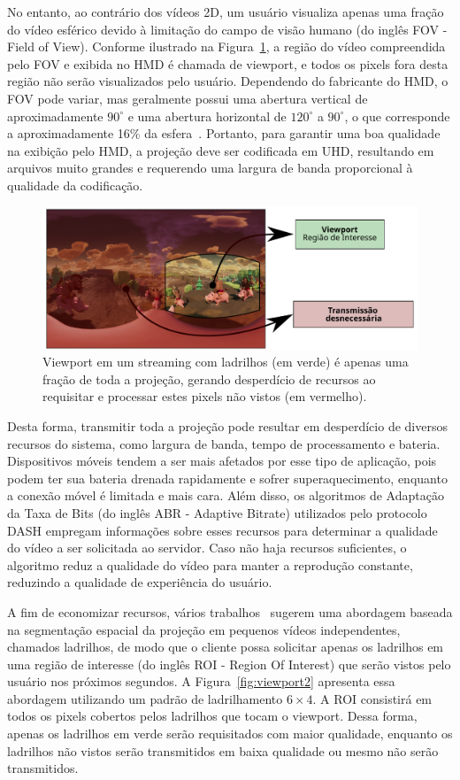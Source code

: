 No entanto, ao contrário dos vídeos 2D, um usuário visualiza apenas uma fração do vídeo esférico devido à limitação do campo de visão humano (do inglês FOV - Field of View). Conforme ilustrado na Figura~\ref{fig:viewport1}, a região do vídeo compreendida pelo FOV e exibida no HMD é chamada de viewport, e todos os pixels fora desta região não serão visualizados pelo usuário. Dependendo do fabricante do HMD, o FOV pode variar, mas geralmente possui uma abertura vertical de aproximadamente $90^{\circ}$ e uma abertura horizontal de $120^{\circ}$ a $90^{\circ}$, o que corresponde a aproximadamente 16\% da esfera~\cite{Afzal2017}. Portanto, para garantir uma boa qualidade na exibição pelo HMD, a projeção deve ser codificada em UHD, resultando em arquivos muito grandes e requerendo uma largura de banda proporcional à qualidade da codificação.

\begin{figure}[h]
	\centering
	\includegraphics[width=0.80\columnwidth]{fig/viewport1.pdf}
	\caption{Viewport em um streaming com ladrilhos (em verde) é apenas uma fração de toda a projeção, gerando desperdício de recursos ao requisitar e processar estes pixels não vistos (em vermelho).}
	\label{fig:viewport1}
\end{figure}

Desta forma, transmitir toda a projeção pode resultar em desperdício de diversos recursos do sistema, como largura de banda, tempo de processamento e bateria. Dispositivos móveis tendem a ser mais afetados por esse tipo de aplicação, pois podem ter sua bateria drenada rapidamente e sofrer superaquecimento, enquanto a conexão móvel é limitada e mais cara. Além disso, os algoritmos de Adaptação da Taxa de Bits (do inglês ABR - Adaptive Bitrate) utilizados pelo protocolo DASH empregam informações sobre esses recursos para determinar a qualidade do vídeo a ser solicitada ao servidor. Caso não haja recursos suficientes, o algoritmo reduz a qualidade do vídeo para manter a reprodução constante, reduzindo a qualidade de experiência do usuário.

A fim de economizar recursos, vários trabalhos~\cite{Alface2012, Zare2016, Qian2018, Liu2017, Graf2017, Xiao2018, Nasrabadi2019} sugerem uma abordagem baseada na segmentação espacial da projeção em pequenos vídeos independentes, chamados ladrilhos, de modo que o cliente possa solicitar apenas os ladrilhos em uma região de interesse (do inglês ROI - Region Of Interest) que serão vistos pelo usuário nos próximos segundos. A Figura~\ref{fig:viewport2} apresenta essa abordagem utilizando um padrão de ladrilhamento $6 \times 4$. A ROI consistirá em todos os pixels cobertos pelos ladrilhos que tocam o viewport. Dessa forma, apenas os ladrilhos em verde serão requisitados com maior qualidade, enquanto os ladrilhos não vistos serão transmitidos em baixa qualidade ou mesmo não serão transmitidos.

